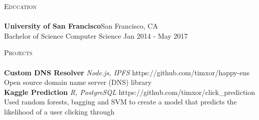 \documentclass[a4paper]{article}
\newcommand{\lineunder} {
    \vspace*{-8pt} \\
    \hspace*{-18pt} \hrulefill \\
}
\newcommand{\header} [1] {
    {\hspace*{-18pt}\vspace*{6pt} \textsc{#1}}
    \vspace*{-6pt} \lineunder
}
\begin{document}
\header{Education}
\textbf{University of San Francisco}\hfill San Francisco, CA\\
Bachelor of Science Computer Science \hfill Jan 2014 - May 2017\\
\vspace{2mm}

\header{Projects}
{\textbf{Custom DNS Resolver}} {\sl Node.js, IPFS} \hfill https://github.com/timxor/happy-ens\\
Open source domain name server (DNS) library\\
\vspace*{2mm}
{\textbf{Kaggle Prediction}} {\sl R, PostgreSQL} \hfill https://github.com/timxor/click\_prediction\\
Used random forests, bagging and SVM to create a model that predicts the likelihood of a user clicking through\\
\vspace*{2mm}



\ 
\end{document}
